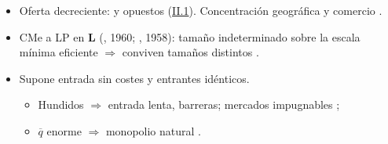 \documentclass{article}
\begin{document}
\begin{columnas}
\begin{itemize}
\begin{itemize}
  \item Oferta decreciente:  y  opuestos (\hyperref[rep:II.1]{II.1}). Concentración geográfica y comercio .
  \end{itemize}
\end{itemize}
\begin{itemize}
\item CMe a LP en \textbf{L} (, 1960; , 1958): tamaño indeterminado sobre la escala mínima eficiente $\Rightarrow$ conviven tamaños distintos .
\item Supone entrada sin costes y entrantes idénticos.
  \begin{itemize}
  \item Hundidos $\Rightarrow$ entrada lenta, barreras; mercados impugnables ;
  \item $\overline{q}$ enorme $\Rightarrow$ monopolio natural .
  \end{itemize}
\end{itemize}


\end{columnas}
\end{document}
